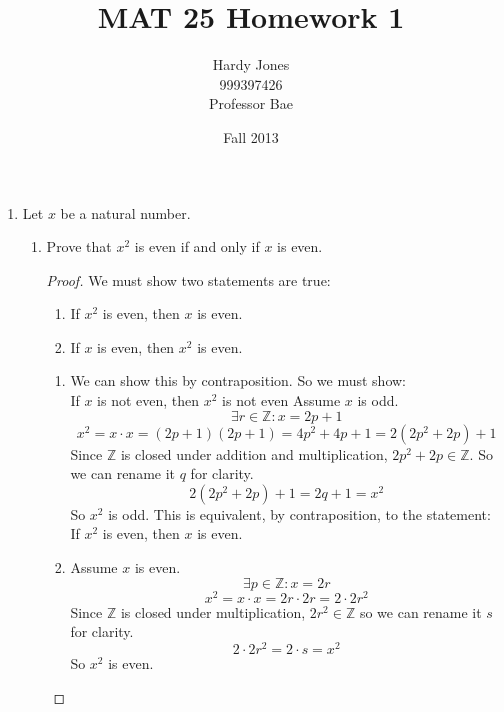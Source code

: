 \documentclass[12pt,letterpaper]{article}
\title{MAT 25 Homework 1\vspace{-2ex}}
\author{Hardy Jones\\
        999397426\\
        Professor Bae\vspace{-2ex}}
\date{Fall 2013}
\begin{document}
\maketitle

\begin{enumerate}
    \item Let $x$ be a natural number.
    \begin{enumerate}
        \item Prove that $x^2$ is even if and only if $x$ is even.

            \begin{proof}

                We must show two statements are true:
                \begin{enumerate}
                    \item If $x^2$ is even, then $x$ is even.
                    \item If $x$ is even, then $x^2$ is even.
                \end{enumerate}


                \begin{enumerate}
                    \item
                        We can show this by contraposition.
                        So we must show: \\
                        If $x$ is not even, then $x^2$ is not even
                        Assume $x$ is odd.
                        \[\exists r \in \mathbb{Z} : x = 2p + 1\]
                        \[
                            x^2 = x \cdot x = (2p + 1) (2p + 1) =
                            4p^2 + 4p + 1 = 2(2p^2 + 2p) + 1
                        \]
                        Since $\mathbb{Z}$ is closed under
                        addition and multiplication, $2p^2 + 2p \in \mathbb{Z}$.
                        So we can rename it $q$ for clarity.
                        \[2(2p^2 + 2p) + 1 = 2q + 1 = x^2\]
                        So $x^2$ is odd.
                        This is equivalent, by contraposition, to the statement: \\
                        If $x^2$ is even, then $x$ is even.

                    \item
                        Assume $x$ is even.
                        \[\exists p \in \mathbb{Z} : x = 2r\]
                        \[x^2 = x \cdot x = 2r \cdot 2r = 2 \cdot 2r^2\]
                        Since $\mathbb{Z}$ is closed under multiplication,
                        $2r^2 \in \mathbb{Z}$ so we can rename it $s$
                        for clarity.
                        \[2 \cdot 2r^2 = 2 \cdot s = x^2\]
                        So $x^2$ is even.
                \end{enumerate}


\end{proof}
\end{enumerate}
\end{enumerate}
\end{document}

